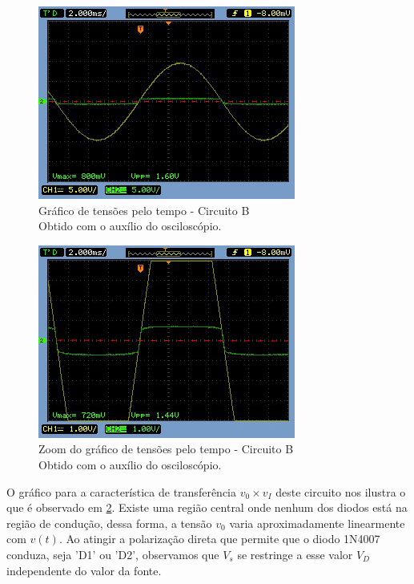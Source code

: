 \documentclass[10pt, final, a4paper]{IEEEtran} %
\begin{document}
\begin{figure}[ht!]
	\captionsetup{justification=centering}
	\centering
	\includegraphics[width=0.8\linewidth]{imagens/circuitos_resp/b01.jpg}
	\caption{Gráfico de tensões pelo tempo - Circuito B\\ Obtido com o auxílio do osciloscópio.}
	\label{b01}
\end{figure}
\FloatBarrier

\begin{figure}[ht!]
	\captionsetup{justification=centering}
	\centering
	\includegraphics[width=0.8\linewidth]{imagens/circuitos_resp/b01_z.jpg}
	\caption{Zoom do gráfico de tensões pelo tempo - Circuito B\\ Obtido com o auxílio do osciloscópio.}
	\label{b01_z}
\end{figure}
\FloatBarrier

O gráfico para a característica de transferência $v_0 \times v_I$ deste circuito nos ilustra o que é observado em \ref{b01_z}. Existe uma região central onde nenhum dos diodos está na região de condução, dessa forma, a tensão $v_0$ varia aproximadamente linearmente com $v(t)$. Ao atingir a polarização direta que permite que o diodo 1N4007 conduza, seja 'D1' ou 'D2', observamos que $V_s$ se restringe a esse valor $V_D$ independente do valor da fonte.
\end{document}
